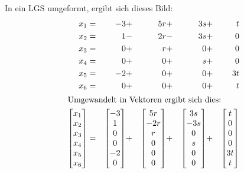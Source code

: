 \documentclass[10pt,a4paper,oneside,ngerman,numbers=noenddot]{scrartcl}
\begin{document}
\subsection{} %
In ein LGS umgeformt, ergibt sich dieses Bild:\\
\begin{alignat*}{5}
x_{1} &=& -3 &+& 5r &+& 3s &+& t \\
x_{2} &=& 1 &-& 2r &-& 3s &+& 0 \\
x_{3} &=& 0 &+& r &+& 0 &+& 0 \\
x_{4} &=& 0 &+& 0 &+& s &+& 0 \\
x_{5} &=& -2 &+& 0 &+& 0 &+& 3t \\
x_{6} &=& 0 &+& 0 &+& 0 &+& t \\
\intertext{Umgewandelt in Vektoren ergibt sich dies:}
\begin{bmatrix}
x_{1} \\
x_{2} \\
x_{3} \\
x_{4} \\
x_{5} \\
x_{6}
\end{bmatrix} &=& 
\begin{bmatrix}
-3 \\
1 \\
0 \\
0 \\
-2 \\
0
\end{bmatrix} &+&
\begin{bmatrix}
5r \\
-2r \\
r \\
0 \\
0 \\
0
\end{bmatrix} &+& 
\begin{bmatrix}
3s \\
-3s \\
0 \\
s \\
0 \\
0
\end{bmatrix} &+&
\begin{bmatrix}
t \\
0 \\
0 \\
0 \\
3t \\
t
\end{bmatrix} \\

\end{alignat*}
\end{document}
